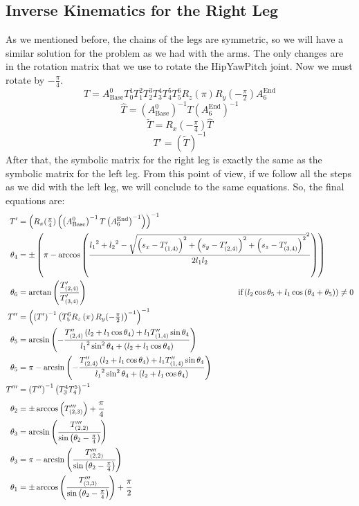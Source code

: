 \subsection{Inverse Kinematics for the Right Leg}
As we mentioned before, the chains of the legs are symmetric, so we will have a similar solution for the problem as we had with the arms. The only changes are in the rotation matrix that we use to rotate the HipYawPitch joint. Now we must rotate by $-\frac{\pi}{4}$.
\[
T = A^0_\text{Base}T^1_0T^2_1T^3_2T^4_3T^5_4T^6_5R_z(\pi)R_y(-\tfrac{\pi}{2})A^\text{End}_6
\]
\[
\widehat{T} = {\left(A^0_\text{Base}\right)}^{-1}T{\left(A^\text{End}_6\right)}^{-1}
\]
\[
\widetilde{T} = R_x(-\tfrac{\pi}{4}) \widehat{T}
\]
\[
T' = {\left(\widetilde{T}\right)}^{-1}
\]
After that, the symbolic matrix for the right leg is exactly the same as the symbolic matrix for the left leg. From this point of view, if we follow all the steps as we did with the left leg, we will conclude to the same equations. So, the final equations are:
\begin{align*}
T' &= \left(R_x(\tfrac{\pi}{4})\left(\left(A^0_\text{Base}\right)^{-1} T \left(A^\text{End}_6\right)^{-1}\right)\right)^{-1} \\
\theta_4 &=\pm\left(\pi - \arccos\left(\frac{{l_1}^2 + {l_2}^2 - \sqrt{\left(s_x-T'_{(1,4)}\right)^2 + \left(s_y-T'_{(2,4)}\right)^2 + \left(s_z-T'_{(3,4)}\right)^2}^2}{2 l_1 l_2}\right)\right) \\
\theta_6 &= \arctan\left(\frac{T'_{(2,4)}}{T'_{(3,4)}}\right)\hspace{6.5cm}\text{if} \left(l_2\cos\theta_5 + l_1 \cos\left(\theta_4 + \theta_5\right)\right) \neq 0 \\
T'' &= \left(\left(T'\right)^{-1}\left(T^6_5R_z\left(\pi\right)R_y(-\tfrac{\pi}{2})\right)^{-1}\right)^{-1} \\
\theta_5 &= \arcsin\left(-\frac{T''_{(2,4)}\left(l_2+l_1\cos\theta_4\right) + l_1T''_{(1,4)}\sin\theta_4}{{l_1}^2\sin^2\theta_4 + \left(l_2 + l_1\cos\theta_4\right)}\right) \\
\theta_5 &= \pi - \arcsin\left(-\frac{T''_{(2,4)}\left(l_2+l_1\cos\theta_4\right) + l_1T''_{(1,4)}\sin\theta_4}{{l_1}^2\sin^2\theta_4 + \left(l_2 + l_1\cos\theta_4\right)}\right)\\
T''' &= \left(T''\right)^{-1}\left(T^4_3T^5_4\right)^{-1} \\
\theta_2 &= \pm\arccos\left(T'''_{(2,3)}\right) + \cfrac{\pi}{4} \\
\theta_3 &= \arcsin\left(\cfrac{T'''_{(2,2)}}{\sin\left(\theta_2 - \frac{\pi}{4}\right)}\right) \\
\theta_3 &= \pi - \arcsin\left(\cfrac{T'''_{(2,2)}}{\sin\left(\theta_2 - \frac{\pi}{4}\right)}\right) \\
\theta_1 &= \pm\arccos\left(\cfrac{T'''_{(3,3)}}{\sin\left(\theta_2 - \frac{\pi}{4}\right)}\right) + \cfrac{\pi}{2}
\end{align*}








